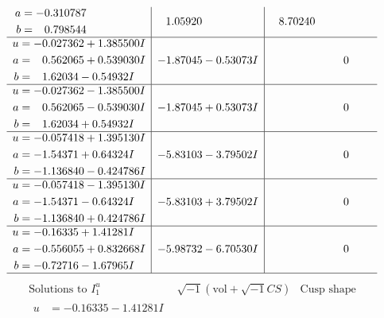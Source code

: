 \documentclass[1p]{elsarticle_modified}
\theoremstyle{definition}
\newcommand{\I}{\sqrt{-1}}
\begin{document}
$$\begin{array}{c|c|c}
\begin{aligned}
a &= -0.310787\phantom{ +0.000000I} \\
b &= \phantom{-}0.798544\phantom{ +0.000000I}\end{aligned}
 & \phantom{-}1.05920\phantom{ +0.000000I} & \phantom{-}8.70240\phantom{ +0.000000I} \\ \hline\begin{aligned}
u &= -0.027362 + 1.385500 I \\
a &= \phantom{-}0.562065 + 0.539030 I \\
b &= \phantom{-}1.62034 - 0.54932 I\end{aligned}
 & -1.87045 - 0.53073 I & \phantom{-0.000000 } 0 \\ \hline\begin{aligned}
u &= -0.027362 - 1.385500 I \\
a &= \phantom{-}0.562065 - 0.539030 I \\
b &= \phantom{-}1.62034 + 0.54932 I\end{aligned}
 & -1.87045 + 0.53073 I & \phantom{-0.000000 } 0 \\ \hline\begin{aligned}
u &= -0.057418 + 1.395130 I \\
a &= -1.54371 + 0.64324 I \\
b &= -1.136840 - 0.424786 I\end{aligned}
 & -5.83103 - 3.79502 I & \phantom{-0.000000 } 0 \\ \hline\begin{aligned}
u &= -0.057418 - 1.395130 I \\
a &= -1.54371 - 0.64324 I \\
b &= -1.136840 + 0.424786 I\end{aligned}
 & -5.83103 + 3.79502 I & \phantom{-0.000000 } 0 \\ \hline\begin{aligned}
u &= -0.16335 + 1.41281 I \\
a &= -0.556055 + 0.832668 I \\
b &= -0.72716 - 1.67965 I\end{aligned}
 & -5.98732 - 6.70530 I & \phantom{-0.000000 } 0\\
 \hline 
 \end{array}$$\newpage$$\begin{array}{c|c|c}  
\text{Solutions to }I^u_{1}& \I (\text{vol} + \sqrt{-1}CS) & \text{Cusp shape}\\
 \hline 
\begin{aligned}
u &= -0.16335 - 1.41281 I \\

\end{aligned}
\end{array}$$
\end{document}
